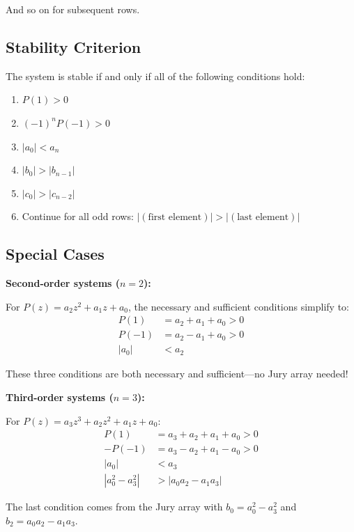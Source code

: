 And so on for subsequent rows.

\subsection{Stability Criterion}

The system is stable if and only if all of the following conditions hold:

\begin{enumerate}
    \item $P(1) > 0$
    \item $(-1)^n P(-1) > 0$
    \item $|a_0| < a_n$
    \item $|b_0| > |b_{n-1}|$
    \item $|c_0| > |c_{n-2}|$
    \item Continue for all odd rows: $|(\text{first element})| > |(\text{last element})|$
\end{enumerate}


\subsection{Special Cases}

\textbf{Second-order systems ($n = 2$):}

For $P(z) = a_2 z^2 + a_1 z + a_0$, the necessary and sufficient conditions simplify to:
\begin{align}
P(1) &= a_2 + a_1 + a_0 > 0 \\
P(-1) &= a_2 - a_1 + a_0 > 0 \\
|a_0| &< a_2
\end{align}

These three conditions are both necessary and sufficient---no Jury array needed!

\textbf{Third-order systems ($n = 3$):}

For $P(z) = a_3 z^3 + a_2 z^2 + a_1 z + a_0$:
\begin{align}
P(1) &= a_3 + a_2 + a_1 + a_0 > 0 \\
-P(-1) &= a_3 - a_2 + a_1 - a_0 > 0 \\
|a_0| &< a_3 \\
|a_0^2 - a_3^2| &> |a_0 a_2 - a_1 a_3|
\end{align}

The last condition comes from the Jury array with $b_0 = a_0^2 - a_3^2$ and $b_2 = a_0 a_2 - a_1 a_3$.

